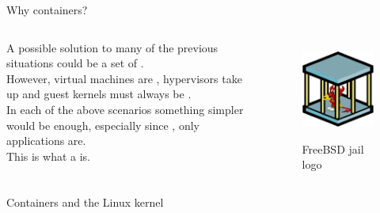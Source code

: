 \begin{frame}{Why containers?}
\begin{columns}
  A possible solution to many of the previous situations could be a set of .\\
  However, virtual machines are , hypervisors take up  and guest kernels must always be .\\
  In each of the above scenarios something simpler would be enough, especially since , only applications are.\\
  This is what a  is.

  \begin{figure}
    \centering
    \includegraphics[scale=.7]{freebsdjail.png}
    \label{fig:jail}
    \caption{FreeBSD jail logo}
  \end{figure}
\end{columns}
\end{frame}

\begin{frame}{Containers and the Linux kernel}
\end{frame}
